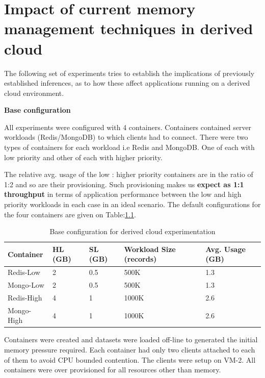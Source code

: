 
\chapter{Impact of current memory management techniques in derived cloud}

  The following set of experiments tries to establish the implications of previously established inferences, as to how these affect 
applications running on a derived cloud environment.
  
  \vspace*{2em}
  \noindent \textbf{Base configuration}
    
  All experiments were configured with 4 containers. Containers contained server workloads (Redis/MongoDB) to which clients had to 
connect. There were two types of containers for each workload i.e Redis and MongoDB. One of each with low priority and other of each with 
higher priority. 

The relative avg. usage of the low : higher priority containers are in the ratio of 1:2 and so are their provisioning. Such provisioning 
makes us \textbf{expect as 1:1 throughput} in terms of application performance between the low and high priority workloads in each case in 
an ideal scenario. The default configurations for the four containers are given on Table:\ref{table_deafult_config}.

    \begin{table}[!htb]
      \begin{center}	   
	\begin{tabular}{ l | p{2cm} | p{2cm} | p{4cm} | p{2cm} }
	  Container & HL (GB) & SL (GB) & Workload Size (records) & Avg. Usage (GB) \\ 
	  \hline
	  \hline
	  Redis-Low & 2 & 0.5 & 500K & 1.3 \\  
	  \hline
	  Mongo-Low & 2 & 0.5 & 500K & 1.3 \\
	  \hline
	  Redis-High & 4 & 1 & 1000K & 2.6 \\  
	  \hline
	  Mongo-High & 4 & 1 & 1000K & 2.6
	\end{tabular}	  
      \end{center}
      \caption{Base configuration for derived cloud experimentation}
      \label{table_deafult_config}	  
    \end{table}

    Containers were created and datasets were loaded off-line to generated the initial memory pressure required. Each container 
had only two clients attached to each of them to avoid CPU bounded contention. The clients were setup on VM-2. All containers were 
over provisioned for all resources other than memory.     
    
